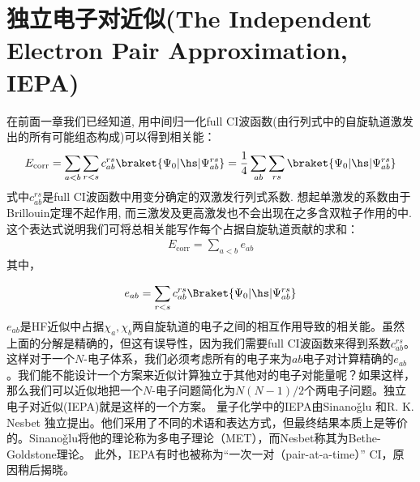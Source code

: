 \section{独立电子对近似(The Independent Electron Pair Approximation, IEPA)}
在前面一章我们已经知道, 
用中间归一化full CI波函数(由\hft 行列式中的自旋轨道激发出的所有可能组态构成)可以得到相关能：
\begin{align}
E_\mathrm{corr} = \sum_{a<b}\sum_{r<s}c_{ab}^{rs}\braket{\Psi_0|\hs|\Psi_{ab}^{rs}} = \frac{1}{4}\sum_{ab}\sum_{rs}\braket{\Psi_0|\hs|\Psi_{ab}^{rs}}
\end{align}
式中$c_{ab}^{rs}$是full CI波函数中用变分确定的双激发行列式系数. 
想起单激发的系数由于Brillouin定理不起作用, 
而三激发及更高激发也不会出现在之多含双粒子作用的\ha 中. 
这个表达式说明我们可将总相关能写作每个占据自旋轨道贡献的求和：
\begin{align}
E_\mathrm{corr} = \sum_{a<b}e_{ab}
\end{align}
其中，

\begin{equation}\label{key}
e_{ab} = \sum_{r<s} c_{ab}^{rs} \Braket{\Psi_0 | \hs | \Psi_{ab}^{rs}}
\end{equation}
$ e_{ab} $是HF近似中占据$ \chi_a,\chi_b $两自旋轨道的电子之间的相互作用导致的相关能。虽然上面的分解是精确的，但这有误导性，因为我们需要full CI波函数来得到系数$ c_{ab}^{rs} $。这样对于一个$ N $-电子体系，我们必须考虑所有的电子来为$ ab $电子对计算精确的$ e_{ab} $。我们能不能设计一个方案来近似计算独立于其他对的电子对能量呢？如果这样，那么我们可以近似地把一个$ N $-电子问题简化为$ N(N-1)/2 $个两电子问题。独立电子对近似(IEPA)就是这样的一个方案。
量子化学中的IEPA由Sinano\v{g}lu
和R. K. Nesbet
独立提出。他们采用了不同的术语和表达方式，但最终结果本质上是等价的。Sinano\v{g}lu将他的理论称为多电子理论（MET），而Nesbet称其为Bethe-Goldstone理论。
此外，IEPA有时也被称为“一次一对（pair-at-a-time）” CI，原因稍后揭晓。

